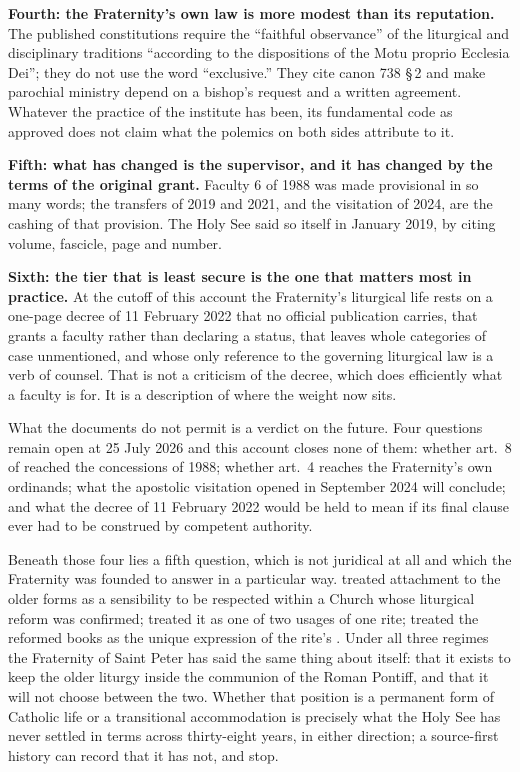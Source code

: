 \textbf{Fourth: the Fraternity's own law is more modest than its
reputation.} The published constitutions require the ``faithful
observance'' of the liturgical and disciplinary traditions ``according to
the dispositions of the Motu proprio Ecclesia Dei''; they do not use the
word ``exclusive.'' They cite canon 738 §\,2 and make parochial ministry
depend on a bishop's request and a written agreement. Whatever the
practice of the institute has been, its fundamental code as approved does
not claim what the polemics on both sides attribute to it.

\textbf{Fifth: what has changed is the supervisor, and it has changed by
the terms of the original grant.} Faculty 6 of 1988 was made provisional
in so many words; the transfers of 2019 and 2021, and the visitation of
2024, are the cashing of that provision. The Holy See said so itself in January 2019, by
citing volume, fascicle, page and number.

\textbf{Sixth: the tier that is least secure is the one that matters
most in practice.} At the cutoff of this account the Fraternity's
liturgical life rests on a one-page decree of 11 February 2022 that no
official publication carries, that grants a faculty rather than declaring
a status, that leaves whole categories of case unmentioned, and whose only
reference to the governing liturgical law is a verb of counsel. That is
not a criticism of the decree, which does efficiently what a faculty is
for. It is a description of where the weight now sits.

What the documents do not permit is a verdict on the future. Four
questions remain open at 25 July 2026 and this account closes none of
them: whether art.~8 of  reached the
concessions of 1988; whether art.~4 reaches the Fraternity's own
ordinands; what the apostolic visitation opened in September 2024 will
conclude; and what the decree of 11 February 2022 would be held to mean if
its final clause ever had to be construed by competent authority.

Beneath those four lies a fifth question, which is not juridical at all
and which the Fraternity was founded to answer in a particular way.
 treated attachment to the older forms as a
sensibility to be respected within a Church whose liturgical reform was
confirmed;  treated it as one of two usages of
one rite;  treated the reformed books as the
unique expression of the rite's . Under all three
regimes the Fraternity of Saint Peter has said the same thing about
itself: that it exists to keep the older liturgy inside the communion of
the Roman Pontiff, and that it will not choose between the two. Whether
that position is a permanent form of Catholic life or a transitional
accommodation is precisely what the Holy See has never settled in terms
across thirty-eight years, in either direction; a source-first history can
record that it has not, and stop.
